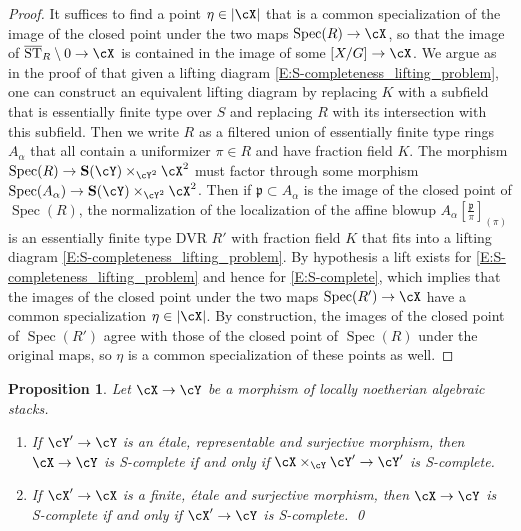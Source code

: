 \documentclass[a4paper]{amsart}
\numberwithin{equation}{section}
\theoremstyle{plain}
\newtheorem{prop}[thm]{Proposition}
\theoremstyle{definition}
\newcommand{\epf}{\qed \vspace{+10pt}}
\DeclareMathOperator{\Spec}{Spec}
\DeclareMathOperator{\ST}{ST}
\def\oST{\overline{\ST}}
\begin{document}
\begin{proof}
It suffices to find a point $\eta \in |\cX|$ that is a common specialization of the image of the closed point under the two maps $\Spec(R) \to \cX$, so that the image of $\oST_R \setminus 0 \to \cX$ is contained in the image of some $[X/G] \to \cX$. We argue as in the proof of  that given a lifting diagram \eqref{E:S-completeness_lifting_problem}, one can construct an equivalent lifting diagram by replacing $K$ with a subfield that is essentially finite type over $S$ and replacing $R$ with its intersection with this subfield. Then we write $R$ as a filtered union of essentially finite type rings $A_{\alpha}$ that all contain a uniformizer $\pi \in R$ and have fraction field $K$. The morphism $\Spec(R) \to \mathbf{S}(\cY) \times_{\cY^2} \cX^2$ must factor through some morphism $\Spec(A_\alpha) \to \mathbf{S}(\cY) \times_{\cY^2} \cX^2$. Then if $\mathfrak{p} \subset A_\alpha$ is the image of the closed point of $\Spec(R)$, the normalization of the localization of the affine blowup $A_\alpha[\frac{\mathfrak{p}}{\pi}]_{(\pi)}$ is an essentially finite type DVR $R'$ with fraction field $K$ that fits into a lifting diagram \eqref{E:S-completeness_lifting_problem}. By hypothesis a lift exists for \eqref{E:S-completeness_lifting_problem} and hence for \eqref{E:S-complete}, which implies that the images of the closed point under the two maps $\Spec(R') \to \cX$ have a common specialization $\eta \in |\cX|$. By construction, the images of the closed point of $\Spec(R')$ agree with those of the closed point of $\Spec(R)$ under the original maps, so $\eta$ is a common specialization of these points as well.
\end{proof}

\begin{prop} \label{P:S-complete-descent} Let $\cX \to \cY$ be a morphism of locally noetherian algebraic stacks.
\begin{enumerate}
\item  If $\cY' \to \cY$ is an \'etale, representable and surjective morphism, then $\cX \to \cY$ is {\textsf{S}}-complete if and only if $\cX \times_{\cY} \cY' \to \cY'$ is {\textsf{S}}-complete.
\item If $\cX' \to \cX$ is a finite, \'etale and surjective morphism, then $\cX \to \cY$ is {\textsf{S}}-complete if and only if $\cX' \to \cY$ is {\textsf{S}}-complete. \epf
\end{enumerate} 
\end{prop}
\end{document}
